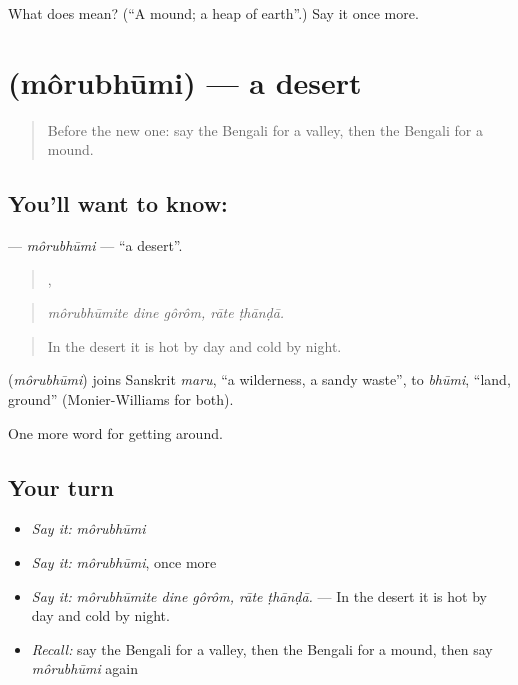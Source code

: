 \begin{tcolorbox}[breakable,colback=teal!4,colframe=teal!35!black,title={Before you move on}]
What does  mean? (\textquotedblleft{}A mound; a heap of earth\textquotedblright{}.) Say it once more.
\end{tcolorbox}
\section[\texorpdfstring{\bn{মরুভূমি} (môrubhūmi)}{মরুভূমি (môrubhūmi)}]{ (môrubhūmi) — a desert}

\label{lesson:BN-C432-morubhumi}



\begin{quote}
Before the new one: say the Bengali for a valley, then the Bengali for a mound.
\end{quote}

\subsection*{You'll want to know: }
\textbf{} — \emph{môrubhūmi} — \textquotedblleft{}a desert\textquotedblright{}.

\begin{quote}
  ,  
\end{quote}

\begin{quote}
\emph{môrubhūmite dine gôrôm, rāte ṭhānḍā.}
\end{quote}

\begin{quote}
In the desert it is hot by day and cold by night.
\end{quote}

\begin{cousinweb}
\textbf{} (\emph{môrubhūmi}) joins Sanskrit \emph{maru}, \textquotedblleft{}a wilderness, a sandy waste\textquotedblright{}, to \emph{bhūmi}, \textquotedblleft{}land, ground\textquotedblright{} (Monier-Williams for both).
\end{cousinweb}

\begin{grammarlens}[title={What you've built}]
One more word for getting around.
\end{grammarlens}

\subsection*{Your turn}
\begin{itemize}
\raggedright
  \item \emph{Say it:} \emph{môrubhūmi}
  \item \emph{Say it:} \emph{môrubhūmi}, once more
  \item \emph{Say it:} \emph{môrubhūmite dine gôrôm, rāte ṭhānḍā.} — In the desert it is hot by day and cold by night.
  \item \emph{Recall:} say the Bengali for a valley, then the Bengali for a mound, then say \emph{môrubhūmi} again
\end{itemize}

